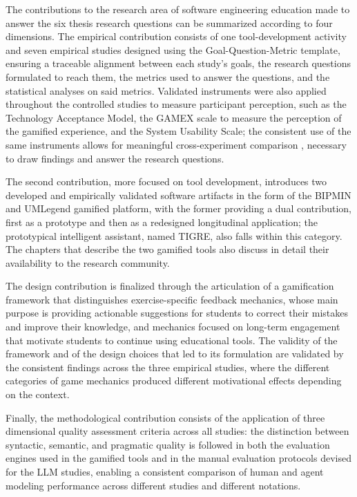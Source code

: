 The contributions to the research area of software engineering education made to answer the six thesis research questions can be summarized according to four dimensions. The empirical contribution consists of one tool-development activity and seven empirical studies designed using the Goal-Question-Metric template, ensuring a traceable alignment between each study's goals, the research questions formulated to reach them, the metrics used to answer the questions, and the statistical analyses on said metrics. Validated instruments were also applied throughout the controlled studies to measure participant perception, such as the Technology Acceptance Model, the GAMEX scale to measure the perception of the gamified experience, and the System Usability Scale; the consistent use of the same instruments allows for meaningful cross-experiment comparison \cite{basili1994gqm}, necessary to draw findings and answer the research questions.

The second contribution, more focused on tool development, introduces two developed and empirically validated software artifacts in the form of the BIPMIN and UMLegend gamified platform, with the former providing a dual contribution, first as a prototype and then as a redesigned longitudinal application; the prototypical intelligent assistant, named TIGRE, also falls within this category. The chapters that describe the two gamified tools also discuss in detail their availability to the research community.

The design contribution is finalized through the articulation of a gamification framework that distinguishes exercise-specific feedback mechanics, whose main purpose is providing actionable suggestions for students to correct their mistakes and improve their knowledge, and mechanics focused on long-term engagement that motivate students to continue using educational tools. The validity of the framework and of the design choices that led to its formulation are validated by the consistent findings across the three empirical studies, where the different categories of game mechanics produced different motivational effects depending on the context.

Finally, the methodological contribution consists of the application of three dimensional quality assessment criteria \cite{lindland1994understanding} across all studies: the distinction between syntactic, semantic, and pragmatic quality is followed in both the evaluation engines used in the gamified tools and in the manual evaluation protocols devised for the LLM studies, enabling a consistent comparison of human and agent modeling performance across different studies and different notations.


